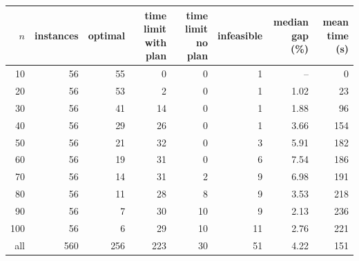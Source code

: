 \begin{tabular}{@{}rrrrrrrr@{}}
\toprule
$n$ & instances & optimal & \shortstack[r]{time limit\\with plan} & \shortstack[r]{time limit\\no plan} & infeasible & \shortstack[r]{median\\gap (\%)} & \shortstack[r]{mean\\time (s)} \\
\midrule
10 & 56 & 55 & 0 & 0 & 1 & -- & 0 \\
20 & 56 & 53 & 2 & 0 & 1 & 1.02 & 23 \\
30 & 56 & 41 & 14 & 0 & 1 & 1.88 & 96 \\
40 & 56 & 29 & 26 & 0 & 1 & 3.66 & 154 \\
50 & 56 & 21 & 32 & 0 & 3 & 5.91 & 182 \\
60 & 56 & 19 & 31 & 0 & 6 & 7.54 & 186 \\
70 & 56 & 14 & 31 & 2 & 9 & 6.98 & 191 \\
80 & 56 & 11 & 28 & 8 & 9 & 3.53 & 218 \\
90 & 56 & 7 & 30 & 10 & 9 & 2.13 & 236 \\
100 & 56 & 6 & 29 & 10 & 11 & 2.76 & 221 \\
\midrule
all & 560 & 256 & 223 & 30 & 51 & 4.22 & 151 \\
\bottomrule
\end{tabular}
